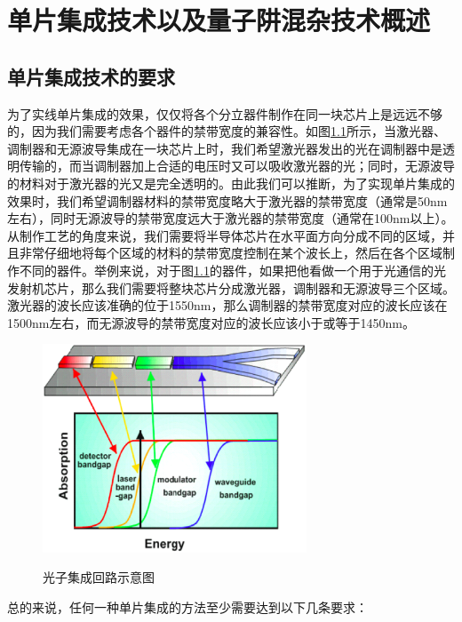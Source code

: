 \documentclass{ZJUthesis}
\begin{document}
\chapter{单片集成技术以及量子阱混杂技术概述}

\section{单片集成技术的要求}

为了实线单片集成的效果，仅仅将各个分立器件制作在同一块芯片上是远远不够的，因为我们需要考虑各个器件的禁带宽度的兼容性。如图\ref{fig_pic}所示，当激光器、调制器和无源波导集成在一块芯片上时，我们希望激光器发出的光在调制器中是透明传输的，而当调制器加上合适的电压时又可以吸收激光器的光；同时，无源波导的材料对于激光器的光又是完全透明的。由此我们可以推断，为了实现单片集成的效果时，我们希望调制器材料的禁带宽度略大于激光器的禁带宽度（通常是50nm左右），同时无源波导的禁带宽度远大于激光器的禁带宽度（通常在100nm以上）。从制作工艺的角度来说，我们需要将半导体芯片在水平面方向分成不同的区域，并且非常仔细地将每个区域的材料的禁带宽度控制在某个波长上，然后在各个区域制作不同的器件。举例来说，对于图\ref{fig_pic}的器件，如果把他看做一个用于光通信的光发射机芯片，那么我们需要将整块芯片分成激光器，调制器和无源波导三个区域。激光器的波长应该准确的位于1550nm，那么调制器的禁带宽度对应的波长应该在1500nm左右，而无源波导的禁带宽度对应的波长应该小于或等于1450nm。

\begin{figure}[!htb]
  \centering
  \includegraphics[width=0.7\textwidth]{./Pictures/pic.eps}\\
  \caption{光子集成回路示意图}
  \label{fig_pic}
\end{figure}

总的来说，任何一种单片集成的方法至少需要达到以下几条要求：
\end{document}
